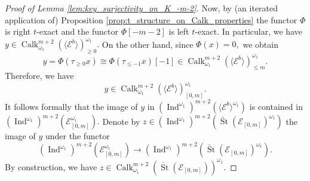 \documentclass[11pt,leqno]{amsart}
\numberwithin{equation}{section}
\newcommand{\St}{\operatorname{St}}
\newcommand{\cE}{{\mathcal E}}
\newcommand{\la}{\langle}
\newcommand{\ra}{\rangle}
\newcommand{\Ind}{\operatorname{Ind}}
\newcommand{\Calk}{\operatorname{Calk}}
\begin{document}
\begin{proof}[Proof of Lemma \ref{lem:key_surjectivity_on_K_-m-2}]
Now, by (an iterated application of) Proposition \ref{prop:t_structure_on_Calk_properties} the functor $\Phi$ is right $t$-exact and the functor $\Phi[-m-2]$ is left $t$-exact. In particular, we have $y\in \Calk_{\omega_1}^{m+2}(\la \cE^b \ra)^{\omega_1}_{\geq 0}.$ On the other hand, since $\Phi(x) = 0,$ we obtain
\begin{equation*}
y = \Phi(\tau_{\geq 0}x)\cong \Phi(\tau_{\leq -1}x)[-1]\in \Calk_{\omega_1}^{m+2}(\la \cE^b \ra)^{\omega_1}_{\leq m}.
\end{equation*}
Therefore, we have
\begin{equation*}
y\in \Calk_{\omega_1}^{m+2}(\la \cE^b \ra)^{\omega_1}_{[0,m]}.
\end{equation*}
It follows formally that the image of $y$ in $(\Ind^{\omega_1})^{m+2}(\la\cE^b\ra^{\omega_1})$ is contained in $(\Ind^{\omega_1})^{m+2}(\cE_{[0,m]}^{\omega_1}).$ Denote by $z\in(\Ind^{\omega_1})^{m+2}(\check{\St}(\cE_{[0,m]})^{\omega_1})$ the image of $y$ under the functor
\begin{equation*}
(\Ind^{\omega_1})^{m+2}(\cE_{[0,m]}^{\omega_1})\to (\Ind^{\omega_1})^{m+2}(\check{\St}(\cE_{[0,m]})^{\omega_1}).
\end{equation*}
By construction, we have $z\in\Calk_{\omega_1}^{m+2}(\check{\St}(\cE_{[0,m]}))^{\omega_1}.$ 


\end{proof}
\end{document}
